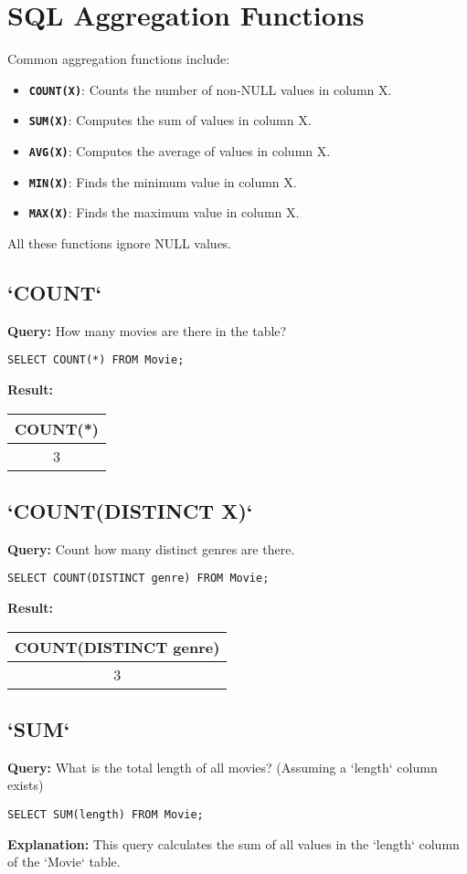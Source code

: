 \documentclass{article}
\begin{document}
\section*{SQL Aggregation Functions}
Common aggregation functions include: 
\begin{itemize}
    \item \textbf{\texttt{COUNT(X)}}: Counts the number of non-NULL values in column X. 
    \item \textbf{\texttt{SUM(X)}}: Computes the sum of values in column X. 
    \item \textbf{\texttt{AVG(X)}}: Computes the average of values in column X. 
    \item \textbf{\texttt{MIN(X)}}: Finds the minimum value in column X. 
    \item \textbf{\texttt{MAX(X)}}: Finds the maximum value in column X. 
\end{itemize}
All these functions ignore NULL values. 

\subsection*{`COUNT`}
\textbf{Query:} How many movies are there in the table? 
\begin{lstlisting}
SELECT COUNT(*) FROM Movie;
\end{lstlisting}
\textbf{Result:} 
\begin{tabular}{|c|}
    \hline
    \textbf{COUNT(*)} \\
    \hline
    3 \\
    \hline
\end{tabular}

\subsection*{`COUNT(DISTINCT X)`}
\textbf{Query:} Count how many distinct genres are there. 
\begin{lstlisting}
SELECT COUNT(DISTINCT genre) FROM Movie;
\end{lstlisting}
\textbf{Result:} 
\begin{tabular}{|c|}
    \hline
    \textbf{COUNT(DISTINCT genre)} \\
    \hline
    3 \\
    \hline
\end{tabular}

\subsection*{`SUM`}
\textbf{Query:} What is the total length of all movies? (Assuming a `length` column exists) 
\begin{lstlisting}
SELECT SUM(length) FROM Movie;
\end{lstlisting}
\textbf{Explanation:} This query calculates the sum of all values in the `length` column of the `Movie` table.
\end{document}
